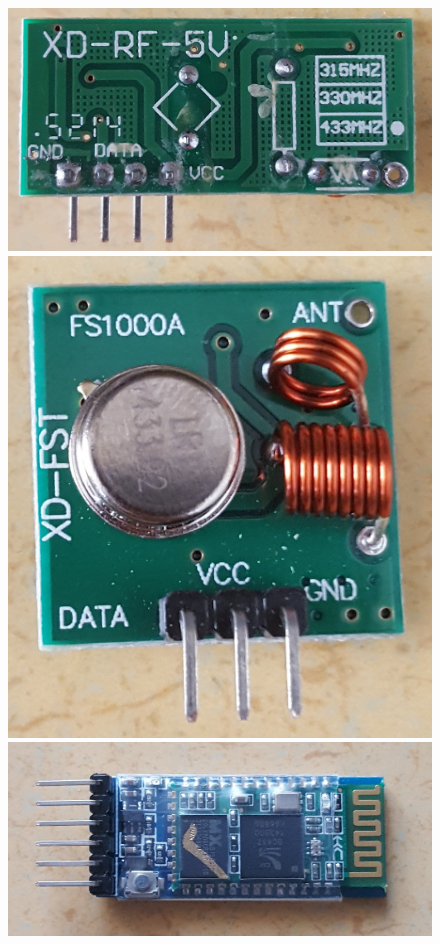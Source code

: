 \documentclass[a4paper]{article}
\begin{document}
\begin{figure}[H]
\centering
\includegraphics[scale=0.06]{RF-transmitter.jpg}
\includegraphics[scale=0.05]{RF-receiver.jpg} \\ \vspace{2mm}
\includegraphics[scale=0.07]{BluetoothFront.jpg}

\end{figure}
\end{document}
